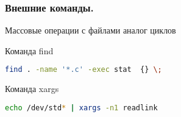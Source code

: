 \begin{frame}[fragile]
\frametitle{Внешние команды.}
Массовые операции с файлами аналог циклов
  \begin{block}{Команда find}
\begin{lstlisting}[language=sh,frame=single]
find . -name '*.c' -exec stat  {} \;
\end{lstlisting}
  \end{block}
  \begin{block}{Команда xargs}
\begin{lstlisting}[language=sh,frame=single]
echo /dev/std* | xargs -n1 readlink
\end{lstlisting}
  \end{block}
\end{frame}
